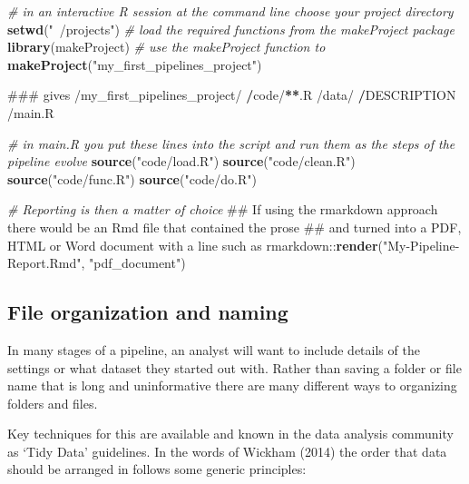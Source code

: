 \documentclass[11pt,a4paper]{article}
\newenvironment{Shaded}{\begin{snugshade}}{\end{snugshade}}
\newcommand{\KeywordTok}[1]{\textcolor[rgb]{0.13,0.29,0.53}{\textbf{{#1}}}}
\newcommand{\StringTok}[1]{\textcolor[rgb]{0.31,0.60,0.02}{{#1}}}
\newcommand{\CommentTok}[1]{\textcolor[rgb]{0.56,0.35,0.01}{\textit{{#1}}}}
\newcommand{\ErrorTok}[1]{\textbf{{#1}}}
\newcommand{\NormalTok}[1]{{#1}}
\begin{document}
\begin{Shaded}
\begin{Highlighting}[]
\CommentTok{# in an interactive R session at the command line choose your project directory}
\KeywordTok{setwd}\NormalTok{(}\StringTok{"~/projects"}\NormalTok{)   }
\CommentTok{# load the required functions from the makeProject package}
\KeywordTok{library}\NormalTok{(makeProject)}
\CommentTok{# use the makeProject function to }
\KeywordTok{makeProject}\NormalTok{(}\StringTok{"my_first_pipelines_project"}\NormalTok{)}

\NormalTok{### gives}
\NormalTok{/my_first_pipelines_project/}
\StringTok{    }\ErrorTok{/}\NormalTok{code/}\ErrorTok{**}\NormalTok{.R}
    \NormalTok{/data/}
\StringTok{    }\ErrorTok{/}\NormalTok{DESCRIPTION}
    \NormalTok{/main.R}

\CommentTok{# in main.R you put these lines into the script and run them as the steps of the pipeline evolve}
\KeywordTok{source}\NormalTok{(}\StringTok{"code/load.R"}\NormalTok{)}
\KeywordTok{source}\NormalTok{(}\StringTok{"code/clean.R"}\NormalTok{)}
\KeywordTok{source}\NormalTok{(}\StringTok{"code/func.R"}\NormalTok{)}
\KeywordTok{source}\NormalTok{(}\StringTok{"code/do.R"}\NormalTok{)}

\CommentTok{# Reporting is then a matter of choice}
\NormalTok{## If using the rmarkdown approach there would be an Rmd file that contained the prose}
\NormalTok{## and turned into a PDF, HTML or Word document with a line such as }
\NormalTok{rmarkdown::}\KeywordTok{render}\NormalTok{(}\StringTok{"My-Pipeline-Report.Rmd"}\NormalTok{, }\StringTok{"pdf_document"}\NormalTok{)}
\end{Highlighting}
\end{Shaded}

\subsection{File organization and
naming}\label{file-organization-and-naming}

In many stages of a pipeline, an analyst will want to include details of
the settings or what dataset they started out with. Rather than saving a
folder or file name that is long and uninformative there are many
different ways to organizing folders and files.

Key techniques for this are available and known in the data analysis
community as `Tidy Data' guidelines. In the words of Wickham (2014) the
order that data should be arranged in follows some generic principles:
\end{document}
